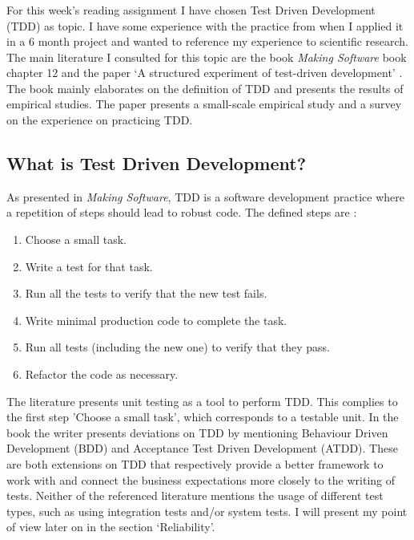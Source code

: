 \subsubsection*{}
For this week's reading assignment I have chosen Test Driven Development (TDD) as topic.
I have some experience with the practice from when I applied it in a 6 month project and wanted to reference my experience to scientific research.
The main literature I consulted for this topic are the book \textit{Making Software} \autocite{MAKING_SOFTWARE} book chapter 12 and the paper `A structured experiment of test-driven development' \autocite{SAC-J-2003-GeorgeW04}.
The book mainly elaborates on the definition of TDD and presents the results of empirical studies.
The paper presents a small-scale empirical study and a survey on the experience on practicing TDD.

\subsection*{What is Test Driven Development?}

As presented in \textit{Making Software}, TDD is a software development practice where a repetition of steps should lead to robust code.
The defined steps are \autocite[208]{MAKING_SOFTWARE}:

\begin{enumerate}
  \item Choose a small task.
  \item Write a test for that task.
  \item Run all the tests to verify that the new test fails.
  \item Write minimal production code to complete the task.
  \item Run all tests (including the new one) to verify that they pass.
  \item Refactor the code as necessary.
\end{enumerate}

The literature presents unit testing as a tool to perform TDD.
This complies to the first step 'Choose a small task', which corresponds to a testable unit.
In the book the writer presents deviations on TDD by mentioning Behaviour Driven Development (BDD) and Acceptance Test Driven Development (ATDD).
These are both extensions on TDD that respectively provide a better framework to work with and connect the business expectations more closely to the writing of tests.
Neither of the referenced literature mentions the usage of different test types, such as using integration tests and/or system tests.
I will present my point of view later on in the section `Reliability'.

